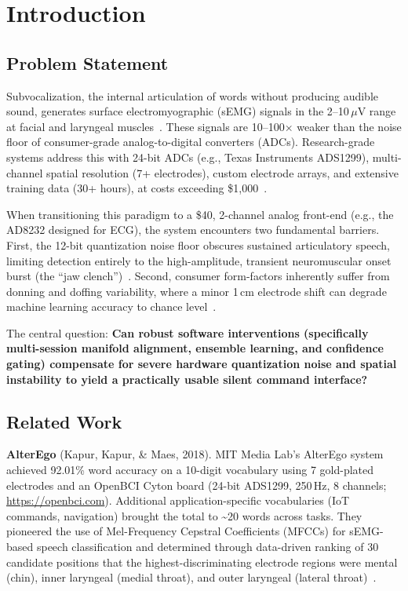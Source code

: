 \documentclass{article}
\begin{document}

\section{Introduction}

\subsection{Problem Statement}

Subvocalization, the internal articulation of words without producing audible sound, generates surface electromyographic (sEMG) signals in the 2--10\,$\mu$V range at facial and laryngeal muscles~\cite{jou2006}. These signals are 10--100$\times$ weaker than the noise floor of consumer-grade analog-to-digital converters (ADCs). Research-grade systems address this with 24-bit ADCs (e.g., Texas Instruments ADS1299), multi-channel spatial resolution (7+ electrodes), custom electrode arrays, and extensive training data (30+ hours), at costs exceeding \$1{,}000~\cite{kapur2018}.

When transitioning this paradigm to a \$40, 2-channel analog front-end (e.g., the AD8232 designed for ECG), the system encounters two fundamental barriers. First, the 12-bit quantization noise floor obscures sustained articulatory speech, limiting detection entirely to the high-amplitude, transient neuromuscular onset burst (the ``jaw clench'')~\cite{nieto2022}. Second, consumer form-factors inherently suffer from donning and doffing variability, where a minor 1\,cm electrode shift can degrade machine learning accuracy to chance level~\cite{meltzner2017}.

The central question: \textbf{Can robust software interventions (specifically multi-session manifold alignment, ensemble learning, and confidence gating) compensate for severe hardware quantization noise and spatial instability to yield a practically usable silent command interface?}

\subsection{Related Work}

\textbf{AlterEgo} (Kapur, Kapur, \& Maes, 2018). MIT Media Lab's AlterEgo system achieved 92.01\% word accuracy on a 10-digit vocabulary using 7 gold-plated electrodes and an OpenBCI Cyton board (24-bit ADS1299, 250\,Hz, 8 channels; \url{https://openbci.com}). Additional application-specific vocabularies (IoT commands, navigation) brought the total to \textasciitilde20 words across tasks. They pioneered the use of Mel-Frequency Cepstral Coefficients (MFCCs) for sEMG-based speech classification and determined through data-driven ranking of 30 candidate positions that the highest-discriminating electrode regions were mental (chin), inner laryngeal (medial throat), and outer laryngeal (lateral throat)~\cite{kapur2018}.
\end{document}
